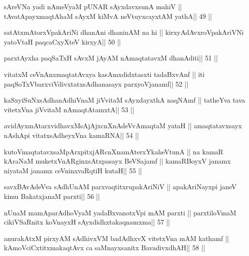 \begin{shl}
sAreVNa yadi nAmeVyaM pUNAR sAyxdavxsunA mahiV ||
tAvatA\s payxmaqtA\s haM sAyxM kiMvA neVtuyxcayxtAM yathA\hfill || 49 ||
\end{shl}

\begin{shl}
satAtxmAtorxVpakAriNi dhanAni dhaninAM na hi ||
kirxyAdAvxroVpakAriVNi yatoV\s taH paqcaCxyXteV kirxyA\hfill || 50 ||
\end{shl}

\begin{shl}
parxtAyxha paqSaTxH sAvxM jAyAM nAmaqtatavxM dhanAditi\hfill || 51 ||
\end{shl}

\begin{shl}
vitatxM ceVnAnxmaqtatAvxya kasAmxdidxtasxti tadaBxvAnf ||
iti paqSoTxV\s barxviVdivxtatxsAdhanasayx parxyoVjanamf\hfill || 52 ||
\end{shl}

\begin{shl}
kaSxyiSuNxsAdhanAdhiVnaM jiVvitaM sAyxdayxthA naqNAmf ||
tatheYva tava vitetxVna jiVvitaM nAmaqtAtamxtA\hfill || 53 ||
\end{shl}

\begin{shl}
avidAyxmAtarxvidhavxMsAjAjxcnXnAdeVvAmaqtaM yataH ||
amaqtatavxsayx nA\s\s shA\s pi vitatxsAdheyxVna kamaRNA\hfill || 54 ||
\end{shl}

\begin{shl}
kutoV\s maqtatavxsaMpArxpitxjARcnXnamAterxYkaheVtunA ||
na kamaR kAraNaM muketxVnARginxsAtxpasayx BeVSajamf ||
kamaRBoyxV janamx niyataM janamx ceVninxvaRqtiH kutaH\hfill || 55 ||
\end{shl}

\begin{shl}
savxBAvAdeVva sAdhUnAM parxvaqtitxrupakAriNiV ||
apakAriNayxpi janeV kimu BakatxjanaM parxti\hfill || 56 ||
\end{shl}

\begin{shl}
nUnaM mamAparAdhoV\s yaM yadaBxvanotxV\s pi mAM parxti ||
parxtiloVmaM cikiVSaRnitx koV\s nayxH sAyxdidhxtakaqnamxma\hfill || 57 ||
\end{shl}

\begin{shl}
anurakAtxM pirxyAM sAdhivxVM badAdhxvX vitetxVna mAM kathamf ||
kAmoVciCxtitxmakaqtAvx ca saMnayxsanitx BavadivxdhAH\hfill || 58 ||
\end{shl}


